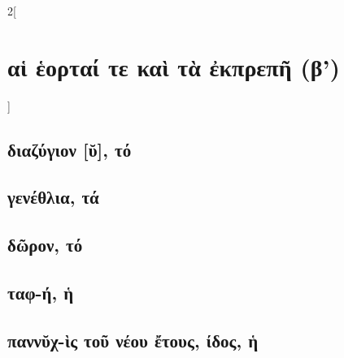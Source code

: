 \documentclass{book}
\begin{document}
\newpage
\begin{multicols}{2}[\section{αἱ ἑορταί τε καὶ τὰ ἐκπρεπῆ (β')}] 
\subsection{διαζύγιον [ῠ], τό}
\subsection{γενέθλια, τά}
\subsection{δῶρον, τό}
\subsection{ταφ-ή, ἡ}
\subsection{παννῠχ-ὶς τοῦ νέου ἔτους, ίδος, ἡ}
~
\end{multicols}
\newpage
\end{document}
